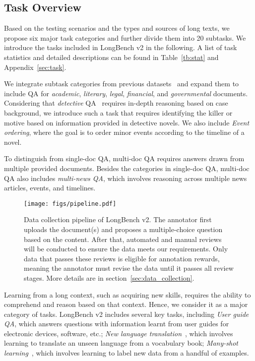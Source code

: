 \subsection{Task Overview}
Based on the testing scenarios and the types and sources of long texts, we propose six major task categories and further divide them into 20 subtasks.
We introduce the tasks included in LongBench v2 in the following. A list of task statistics and detailed descriptions can be found in Table~\ref{tb:stat} and Appendix~\ref{sec:task}.

We integrate subtask categories from previous datasets~\cite{bai2024longbench,an2024leval} and expand them to include QA for \emph{academic}, \emph{literary}, \emph{legal}, \emph{financial}, and \emph{governmental} documents. 
Considering that \emph{detective} QA~\cite{xu2024detectiveqa} requires in-depth reasoning based on case background, we introduce such a task that requires identifying the killer or motive based on information provided in detective novels.
We also include \emph{Event ordering}, where the goal is to order minor events according to the timeline of a novel.

To distinguish from single-doc QA, multi-doc QA requires answers drawn from multiple provided documents.
Besides the categories in single-doc QA, multi-doc QA also includes \emph{multi-news QA}, which involves reasoning across multiple news articles, events, and timelines.

\begin{figure*}[t]
    \centering
    \texttt{[image: figs/pipeline.pdf]}
    \caption{Data collection pipeline of LongBench v2. The annotator first uploads the document(s) and proposes a multiple-choice question based on the content. After that, automated and manual reviews will be conducted to ensure the data meets our requirements. Only data that passes these reviews is eligible for annotation rewards, meaning the annotator must revise the data until it passes all review stages. More details are in section~\ref{sec:data_collection}.}
    \label{fig:pipeline}
\end{figure*}

Learning from a long context, such as acquiring new skills, requires the ability to comprehend and reason based on that context. Hence, we consider it as a major category of tasks.
LongBench v2 includes several key tasks, including \emph{User guide QA}, which answers questions with information learnt from user guides for electronic devices, software, etc.; \emph{New language translation}~\cite{tanzerbenchmark,zhang2024teaching}, which involves learning to translate an unseen language from a vocabulary book; \emph{Many-shot learning}~\cite{agarwal2024many}, which involves learning to label new data from a handful of examples.

